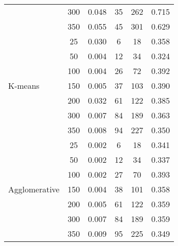 \begin{table}[htbp]
\begin{tabular}{lccccc}
                           & 300             & 0.048             & 35                & 262               & 0.715                \\
                           & 350             & 0.055             & 45                & 301               & 0.629                \\
        \midrule
        \multirow{7}{*}{K-means}
                           & 25              & 0.030             & 6                 & 18                & 0.358                \\
                           & 50              & 0.004             & 12                & 34                & 0.324                \\
                           & 100             & 0.004             & 26                & 72                & 0.392                \\
                           & 150             & 0.005             & 37                & 103               & 0.390                \\
                           & 200             & 0.032             & 61                & 122               & 0.385                \\
                           & 300             & 0.007             & 84                & 189               & 0.363                \\
                           & 350             & 0.008             & 94                & 227               & 0.350                \\
        \midrule
        \multirow{7}{*}{Agglomerative}
                           & 25              & 0.002             & 6                 & 18                & 0.341                \\
                           & 50              & 0.002             & 12                & 34                & 0.337                \\
                           & 100             & 0.002             & 27                & 70                & 0.393                \\
                           & 150             & 0.004             & 38                & 101               & 0.358                \\
                           & 200             & 0.005             & 61                & 122               & 0.359                \\
                           & 300             & 0.007             & 84                & 189               & 0.359                \\
                           & 350             & 0.009             & 95                & 225               & 0.349                \\
        \bottomrule
    \end{tabular}
\end{table}

